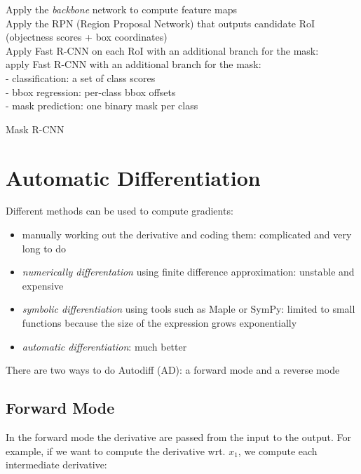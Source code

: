\begin{algorithm}[H]
\DontPrintSemicolon
{}
 Apply the \textit{backbone} network to compute feature maps \\
 Apply the RPN (Region Proposal Network) that outputs candidate RoI (objectness scores + box coordinates) \\
 Apply Fast R-CNN on each RoI with an additional branch for the mask:\\
 {
  apply Fast R-CNN with an additional branch for the mask: \\
 - classification: a set of class scores  \\
 - bbox regression: per-class bbox offsets \\
 - mask prediction: one binary mask per class 
 }
 \caption{Mask R-CNN}
\end{algorithm}

\section{Automatic Differentiation}


Different methods can be used to compute gradients:
\begin{itemize}
    \item manually working out the derivative and coding them: complicated and very long to do
    \item \textit{numerically differentation} using finite difference approximation: unstable and expensive
    \item \textit{symbolic differentiation} using tools such as Maple or SymPy: limited to small functions because the size of the expression grows exponentially
    \item \textit{automatic differentiation}: much better
\end{itemize}



There are two ways to do Autodiff (AD): a forward mode and a reverse mode

\subsection{Forward Mode}

In the forward mode the derivative are passed from the input to the output. For example, if we want to compute the derivative wrt. $x_1$, we compute each intermediate derivative:

